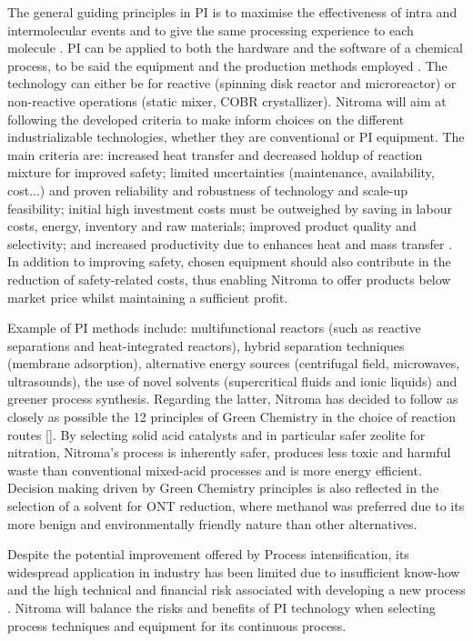 The general guiding principles in PI is to maximise the effectiveness of intra and intermolecular events and to give the same processing experience to each molecule \cite{randall_process_2020}. PI can be applied to both the hardware and the software of a chemical process, to be said the equipment and the production methods employed \cite{stankiewicz_re-engineering_2003}. The technology can either be for reactive (spinning disk reactor and microreactor) or non-reactive operations (static mixer, COBR crystallizer). Nitroma will aim at following the developed criteria to make inform choices on the different industrializable technologies, whether they are conventional or PI equipment. The main criteria are: increased heat transfer and decreased holdup of reaction mixture for improved safety; limited uncertainties (maintenance, availability, cost...) and proven reliability and robustness of technology and scale-up feasibility; initial high investment costs must be outweighed by saving in labour costs, energy, inventory and raw materials; improved product quality and selectivity; and increased productivity due to enhances heat and mass transfer \cite{randall_process_2020}. In addition to improving safety, chosen equipment should also contribute in the reduction of safety-related costs, thus enabling Nitroma to offer products below market price whilst maintaining a sufficient profit.

Example of PI methods include: multifunctional reactors (such as reactive separations and heat-integrated reactors), hybrid separation techniques (membrane adsorption), alternative energy sources (centrifugal field, microwaves, ultrasounds), the use of novel solvents (supercritical fluids and ionic liquids) and greener process synthesis. Regarding the latter, Nitroma has decided to follow as closely as possible the 12 principles of Green Chemistry in the choice of reaction routes []. By selecting solid acid catalysts and in particular safer zeolite for nitration, Nitroma's process is inherently safer, produces less toxic and harmful waste than conventional mixed-acid processes and is more energy efficient. Decision making driven by Green Chemistry principles is also reflected in the selection of a solvent for ONT reduction, where methanol was preferred due to its more benign and environmentally friendly nature than other alternatives.

Despite the potential improvement offered by Process intensification, its widespread application in industry has been limited due to insufficient know-how and the high technical and financial risk associated with developing a new process \cite{randall_process_2020}. Nitroma will balance the risks and benefits of PI technology when selecting process techniques and equipment for its continuous process.


